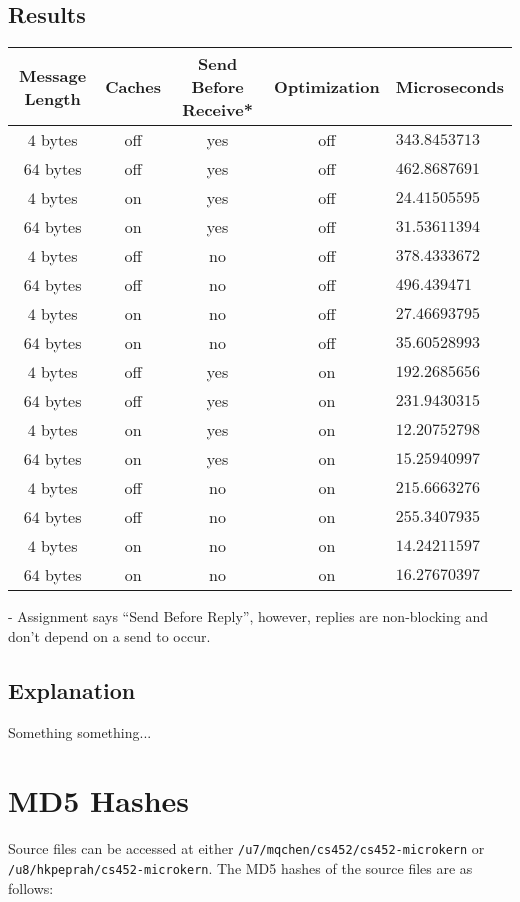 \documentclass[12pt]{article}
\begin{document}
\subsection{Results}
\begin{tabular}{|c|c|c|c|l|}
  \hline
  {\bf Message Length} & {\bf Caches} & {\bf Send Before Receive*} & {\bf Optimization } & {\bf Microseconds} \\\hline
  $4$ bytes & off & yes & off & $343.8453713$ \\\hline
  $64$ bytes & off & yes & off & $462.8687691$ \\\hline
  $4$ bytes & on & yes & off & $24.41505595$ \\\hline
  $64$ bytes & on & yes & off & $31.53611394$ \\\hline
  $4$ bytes & off & no & off & $378.4333672$ \\\hline
  $64$ bytes & off & no & off & $496.439471$ \\\hline
  $4$ bytes & on & no & off & $27.46693795$ \\\hline
  $64$ bytes & on & no & off & $35.60528993$ \\\hline
  $4$ bytes & off & yes & on & $192.2685656$ \\\hline
  $64$ bytes & off & yes & on & $231.9430315$ \\\hline
  $4$ bytes & on & yes & on & $12.20752798$ \\\hline
  $64$ bytes & on & yes & on & $15.25940997$ \\\hline
  $4$ bytes & off & no & on & $215.6663276$ \\\hline
  $64$ bytes & off & no & on & $255.3407935$ \\\hline
  $4$ bytes & on & no & on & $14.24211597$ \\\hline
  $64$ bytes & on & no & on & $16.27670397$ \\\hline
\end{tabular}
{\tiny {\bf *} - Assignment says ``Send Before Reply'', however, replies are non-blocking and don't depend on a send to occur.}
\\[1\baselineskip]
\subsection{Explanation}
Something something...
\\[2\baselineskip]
\section{MD5 Hashes}
Source files can be accessed at either \texttt{/u7/mqchen/cs452/cs452-microkern} or \\ \texttt{/u8/hkpeprah/cs452-microkern}. The MD5 hashes of the source files are as follows:\\
% 
\end{document}
